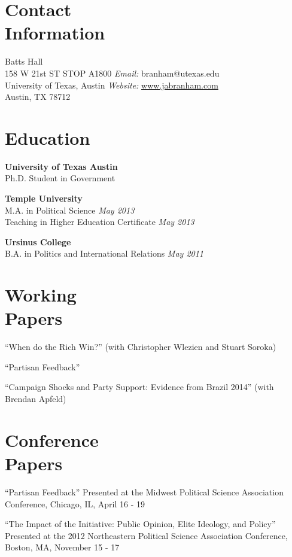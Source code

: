 \documentclass[margin,line]{res}
\newenvironment{list2}{
    \begin{list}{--}{%
        \setlength{\itemsep}{0in}
        \setlength{\parsep}{0in} \setlength{\parskip}{0in}
        \setlength{\topsep}{0in} \setlength{\partopsep}{0in}
        \setlength{\leftmargin}{0.2in}}}{\end{list}}
\begin{document}

\begin{resume}


\section{\sc Contact \\Information}
Batts Hall               \hfill     \\
158 W 21st ST STOP A1800                     \hfill    {\em Email:}    branham@utexas.edu \\
University of Texas, Austin     \hfill    {\em Website:}   \href{www.jabranham.com}{www.jabranham.com} \\
Austin, TX 78712                  \hfill


\section{\sc Education}
{\bf University of Texas Austin}     \hfill     \\
 Ph.D. Student in Government       \hfill 

{\bf Temple University} \hfill  \\
M.A. in Political Science  \hfill     {\em  May 2013} \\
Teaching in Higher Education Certificate \hfill {\em May 2013}

{\bf Ursinus College}   \hfill     \\ 
B.A. in Politics and International Relations    \hfill      {\em May 2011} \\

\section{\sc Working\\Papers}
\begin{list2}
	\item ``When do the Rich Win?'' (with Christopher Wlezien and Stuart Soroka)
	\item ``Partisan Feedback''
	\item ``Campaign Shocks and Party Support: Evidence from Brazil 2014'' (with Brendan Apfeld)
\end{list2}

\section{\sc Conference\\Papers}
\begin{list2}
	\item ``Partisan Feedback'' Presented at the Midwest Political Science Association Conference, Chicago, IL, April 16 - 19
	\item ``The Impact of the Initiative: Public Opinion, Elite Ideology, and Policy'' Presented at the 2012 Northeastern Political Science Association Conference, Boston, MA, November 15 - 17
\end{list2}


\end{resume}
\end{document}
